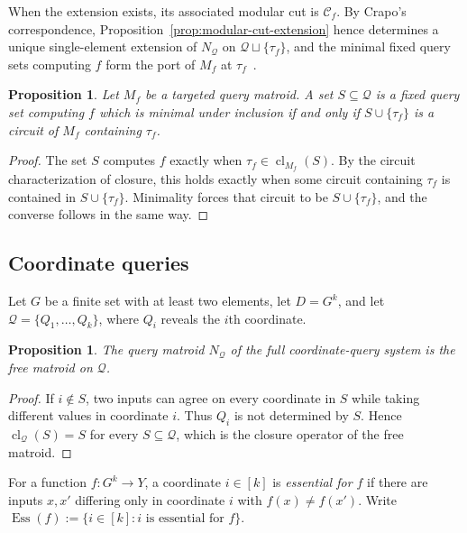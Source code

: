 \documentclass[11pt]{article}
\numberwithin{equation}{section}
\newtheorem{proposition}[definition]{Proposition}
\theoremstyle{remark}
\newcommand{\cl}{\operatorname{cl}}
\begin{document}
When the extension exists, its associated modular cut is $\mathcal C_f$. By
Crapo's correspondence, Proposition~\ref{prop:modular-cut-extension} hence
determines a unique single-element extension of $N_{\mathcal Q}$ on
$\mathcal Q\sqcup\{\tau_f\}$, and the minimal fixed query sets computing
$f$ form the port of $M_f$ at $\tau_f$~\cite{Lehman1964,Seymour1976Ports}.

\begin{proposition}
\label{prop:minimal-query-circuits}
Let $M_f$ be a targeted query matroid. A set $S\subseteq\mathcal Q$ is a
fixed query set computing $f$ which is minimal under inclusion if and only if
$S\cup\{\tau_f\}$ is a circuit of $M_f$ containing $\tau_f$.
\end{proposition}

\begin{proof}
The set $S$ computes $f$ exactly when
$\tau_f\in\cl_{M_f}(S)$. By the circuit characterization of closure, this
holds exactly when some circuit containing $\tau_f$ is contained in
$S\cup\{\tau_f\}$. Minimality forces that circuit to be
$S\cup\{\tau_f\}$, and the converse follows in the same way.
\end{proof}

\subsection{Coordinate queries}
\label{subsec:coordinate-query-matroids}

Let $G$ be a finite set with at least two elements, let $D=G^k$, and let
$\mathcal Q=\{Q_1,\ldots,Q_k\}$, where $Q_i$ reveals the $i$th coordinate.

\begin{proposition}
\label{prop:coordinate-query-matroid}
The query matroid $N_{\mathcal Q}$ of the full coordinate-query system is the
free matroid on $\mathcal Q$.
\end{proposition}

\begin{proof}
If $i\notin S$, two inputs can agree on every coordinate in $S$ while taking
different values in coordinate $i$. Thus $Q_i$ is not determined by $S$.
Hence $\operatorname{cl}_{\mathcal Q}(S)=S$ for every
$S\subseteq\mathcal Q$, which is the closure operator of the free matroid.
\end{proof}

For a function $f:G^k\to Y$, a coordinate $i\in[k]$ is
\emph{essential for $f$} if there are inputs $x,x'$ differing only in
coordinate $i$ with $f(x)\neq f(x')$. Write
$\operatorname{Ess}(f):=\{i\in[k]:i\text{ is essential for }f\}$.
\end{document}

